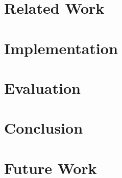 







\cleardoublepage{}


\tableofcontents

\chapter{}
\label{introduction}


\chapter{Related Work}
\label{relatedwork}


\chapter{Implementation}
\label{implementation}


\chapter{Evaluation}
\label{evaluation}


\chapter{Conclusion}
\label{conclusion}


\chapter{Future Work}
\label{future_work}


{}


